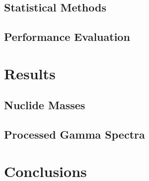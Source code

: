 \documentclass[10pt]{beamer}
\begin{document}
\subsection{Statistical Methods}

\subsection{Performance Evaluation}


\section{Results}
\subsection{Nuclide Masses}

\subsection{Processed Gamma Spectra}


\section{Conclusions}


\end{document}
